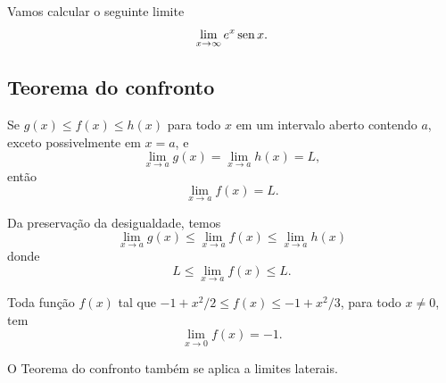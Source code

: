 \begin{ex}
  Vamos calcular o seguinte limite
  \begin{equation}
    \lim_{x\to \infty} e^x\operatorname{sen} x.
  \end{equation}

  \emconstrucao
\end{ex}


\subsection{Teorema do confronto}

\begin{teo}\label{teo:confronto}
  Se $g(x) \leq f(x) \leq h(x)$ para todo $x$ em um intervalo aberto contendo $a$, exceto possivelmente em $x=a$, e
  \begin{equation}
    \lim_{x\to a} g(x) = \lim_{x\to a} h(x) = L,
  \end{equation}
  então
  \begin{equation}
    \lim_{x\to a} f(x) = L.
  \end{equation}
\end{teo}
\begin{dem}
  Da preservação da desigualdade, temos
  \begin{equation}
    \lim_{x\to a} g(x) \leq \lim_{x\to a} f(x) \leq \lim_{x\to a} h(x)
  \end{equation}
  donde
  \begin{equation}
    L \leq \lim_{x\to a} f(x) \leq L.
  \end{equation}
\end{dem}

\begin{exer}
  Toda função $f(x)$ tal que $-1+x^2/2 \leq f(x) \leq -1+x^2/3$, para todo $x\neq 0$, tem
  \begin{equation}
    \lim_{x\to 0} f(x) = -1.
  \end{equation}
\end{exer}

\begin{obs}
  O Teorema do confronto também se aplica a limites laterais.
\end{obs}

